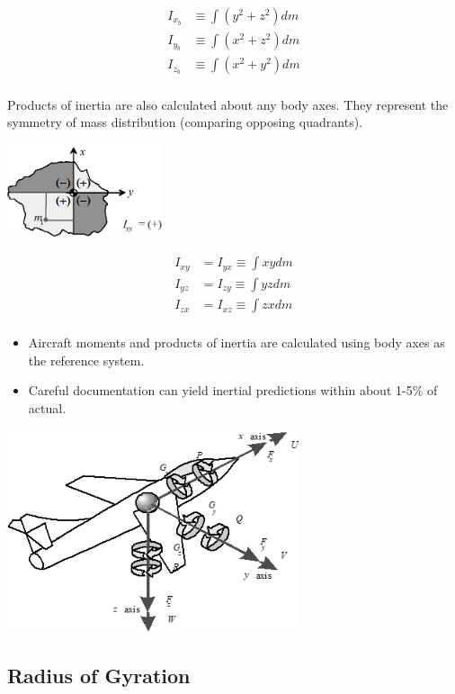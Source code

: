 \documentclass[
]{book}
\providecommand{\tightlist}{%
  \setlength{\itemsep}{0pt}\setlength{\parskip}{0pt}}
\begin{document}
\begin{align}
I_{x_b} &\equiv \int \left( y^2 + z^2 \right) dm \\
I_{y_b} &\equiv \int \left( x^2 + z^2 \right) dm \\
I_{z_b} &\equiv \int \left( x^2 + y^2 \right) dm \\
\end{align}

Products of inertia are also calculated about any body axes. They represent the symmetry of mass distribution (comparing opposing quadrants).

\includegraphics[width=1.79236in,height=1.07083in]{media/07/image16.png}

\begin{align}
I_{xy} &= I_{yx} \equiv \int xy dm \\
I_{yz} &= I_{zy} \equiv \int yz dm \\
I_{zx} &= I_{xz} \equiv \int zx dm \\
\end{align}

\begin{itemize}
\tightlist
\item
  Aircraft moments and products of inertia are calculated using body axes as the reference system.
\item
  Careful documentation can yield inertial predictions within about 1-5\% of actual.
\end{itemize}

\includegraphics[width=3.37222in,height=2.33681in]{media/07/image17.png}

\hypertarget{radius-of-gyration}{%
\subsection{Radius of Gyration}\label{radius-of-gyration}}
\end{document}
